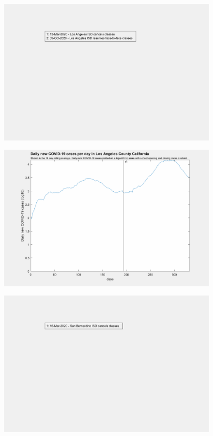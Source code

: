 \documentclass[]{article}
\begin{document}
\begin{figure}[!h]
	\includegraphics[width=\linewidth]{legends/los_angeles_school_legend.png}
	\caption{}
	\label{fig:legends/los_angeles_school_legendLabel}
\end{figure}

\begin{figure}[!h]
	\includegraphics[width=\linewidth]{images/los_angeles_cases_school_log.png}
	\caption{}
	\label{fig:images/los_angeles_cases_school_logLabel}
\end{figure}

\begin{figure}[!h]
	\includegraphics[width=\linewidth]{legends/san_bernardino_school_legend.png}
	\caption{}
	\label{fig:legends/san_bernardino_school_legendLabel}
\end{figure}
\end{document}
